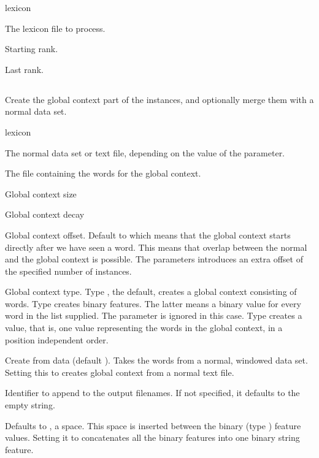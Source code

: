 \documentclass[a4paper,10pt,twoside]{report}
\begin{document}
\begin{varlist}{lexicon}
\item[lexicon] The lexicon file to process.
\item[n] Starting rank.
\item[m] Last rank.
\end{varlist}

\subsection{}

Create the global context part of the instances, and optionally merge
them with a normal data set.

\begin{varlist}{lexicon}
\item[filename] The normal data set or text file, depending on the
  value of the  parameter.
\item[range] The file containing the words for the global context.
\item[gcs] Global context size
\item[gcd] Global context decay
\item[gco] Global context offset. Default to  which means that
  the global context starts directly after we have seen a word. This
  means that overlap between the normal and the global context is
  possible. The  parameters introduces an extra offset of the
  specified number of instances. 
\item[gct] Global context type. Type , the default, creates a
  global context consisting of words. Type  creates binary
  features. The latter means a binary value for every word in the
   list supplied. The  parameter is ignored in
  this case. Type  creates a  value, that is, one
  value representing the words in the global context, in a position
  independent order.
\item[fd] Create from data (default ). Takes the words from a
  normal, windowed data set. Setting this to  creates global
  context from a normal text file.
\item[id] Identifier to append to the output filenames. If not
  specified, it defaults to the empty string.
\item[gc\_sep] Defaults to , a space. This space is inserted
  between the binary (type ) feature values. Setting it to
   concatenates all the binary features into one binary string
  feature. 
\end{varlist}
\end{document}
